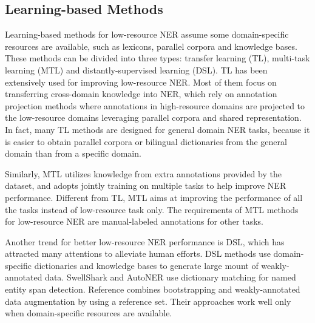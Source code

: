 \documentclass[10pt, conference, compsocconf]{IEEEtran}
\begin{document}
\subsection{Learning-based Methods} 
Learning-based methods for low-resource NER assume some domain-specific resources are available, such as
lexicons, parallel corpora and knowledge bases. 
These methods can be divided into three types: transfer learning (TL), multi-task learning (MTL)
and distantly-supervised learning (DSL).
TL has been extensively used for improving low-resource NER\cite{li2012joint, yang2017transfer}.
Most of them focus on transferring cross-domain knowledge into NER, which
rely on annotation projection methods where annotations in high-resource domains
are projected to the low-resource domains leveraging parallel corpora\cite{chen2010jointly, ni-etal-2017-weakly} and shared representation\cite{zhou-etal-2019-dual,chaudhary-etal-2019-little,cao-etal-2019-low}. 
In fact, many TL methods are designed for general domain NER tasks, 
because it is easier to obtain parallel corpora or bilingual dictionaries from the general domain than 
from a specific domain.


Similarly, MTL utilizes knowledge from extra annotations provided by the dataset, and
adopts jointly training on multiple tasks to help improve NER performance\cite{luan-etal-2018-multi,eberts2019span,wadden-etal-2019-entity}. 
Different from TL, MTL aims at improving the performance of all the tasks instead of low-resource task only. 
The requirements of MTL methods for low-resource NER are manual-labeled annotations for other tasks.

Another trend for better low-resource NER performance is DSL, which has attracted many attentions
to alleviate human efforts. DSL methods use domain-specific dictionaries and knowledge bases to
generate large mount of weakly-annotated data. 
SwellShark\cite{fries2017swellshark} and AutoNER\cite{shang-etal-2018-learning} use dictionary matching 
for named entity span detection. Reference\cite{mathew2019biomedical} combines bootstrapping
and weakly-annotated data augmentation by using a reference set. Their approaches work well only
when domain-specific resources are available.



\end{document}
